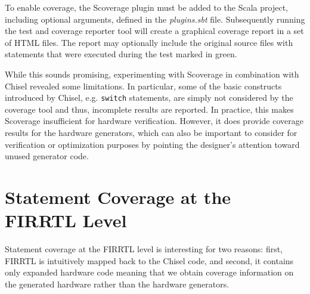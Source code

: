\documentclass[a4paper]{IEEEtran}
\begin{document}
To enable coverage, the Scoverage plugin must be added to the Scala project, including optional arguments, defined in the \textit{plugins.sbt} file. 
Subsequently running the test and coverage reporter tool will create a graphical coverage report in a set of HTML files. The report may optionally include the original source files with statements that were executed during the test marked in green. %

While this sounds promising, experimenting with Scoverage in combination with Chisel revealed some limitations. In particular, some of the basic constructs introduced by Chisel, e.g. \texttt{switch} statements, are simply not considered by the coverage tool and thus, incomplete results are reported. In practice, this makes Scoverage insufficient for hardware verification. However, it does provide coverage results for the hardware generators, which can also be important to consider for verification or optimization purposes by pointing the designer's attention toward unused generator code.

\section{Statement Coverage at the FIRRTL Level}  
Statement coverage at the FIRRTL level is interesting for two reasons: first, FIRRTL is intuitively mapped back to the Chisel code, and second, it contains only expanded hardware code meaning that we obtain coverage information on the generated hardware rather than the hardware generators.%
\end{document}
